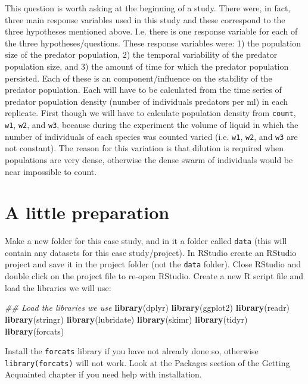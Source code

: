 \documentclass[]{book}
\makeatletter
\newenvironment{Shaded}{\begin{snugshade}}{\end{snugshade}}
\newcommand{\CommentTok}[1]{\textcolor[rgb]{0.56,0.35,0.01}{\textit{#1}}}
\newcommand{\KeywordTok}[1]{\textcolor[rgb]{0.13,0.29,0.53}{\textbf{#1}}}
\newcommand{\NormalTok}[1]{#1}
\newenvironment{kframe}{%
\medskip{}
\setlength{\fboxsep}{.8em}
 \def\at@end@of@kframe{}%
 \ifinner\ifhmode%
  \def\at@end@of@kframe{\end{minipage}}%
  \begin{minipage}{\columnwidth}%
 \fi\fi%
 \def\FrameCommand##1{\hskip\@totalleftmargin \hskip-\fboxsep
 \colorbox{shadecolor}{##1}\hskip-\fboxsep
     \hskip-\linewidth \hskip-\@totalleftmargin \hskip\columnwidth}%
 \MakeFramed {\advance\hsize-\width
   \@totalleftmargin\z@ \linewidth\hsize
   \@setminipage}}%
 {\par\unskip\endMakeFramed%
 \at@end@of@kframe}
\newenvironment{rmdblock}[1]
  {
  \begin{itemize}
  \renewcommand{\labelitemi}{
    \raisebox{-.7\height}[0pt][0pt]{
      {\setkeys{Gin}{width=3em,keepaspectratio}\texttt{[image: images/\#1]}}
    }
  }
  \setlength{\fboxsep}{1em}
  \begin{kframe}
  \item
  }
  {
  \end{kframe}
  \end{itemize}
  }
\newenvironment{action}
  {\begin{rmdblock}{action}}
  {\end{rmdblock}}
\makeatother
\begin{document}
This question is worth asking at the beginning of a study. There were, in fact, three main response variables used in this study and these correspond to the three hypotheses mentioned above. I.e. there is one response variable for each of the three hypotheses/questions. These response variables were: 1) the population size of the predator population, 2) the temporal variability of the predator population size, and 3) the amount of time for which the predator population persisted. Each of these is an component/influence on the stability of the predator population. Each will have to be calculated from the time series of predator population density (number of individuals predators per ml) in each replicate. First though we will have to calculate population density from \texttt{count}, \texttt{w1}, \texttt{w2}, and \texttt{w3}, because during the experiment the volume of liquid in which the number of individuals of each species was counted varied (i.e. \texttt{w1}, \texttt{w2}, and \texttt{w3} are not constant). The reason for this variation is that dilution is required when populations are very dense, otherwise the dense swarm of individuals would be near impossible to count.

\hypertarget{a-little-preparation-1}{%
\section{A little preparation}\label{a-little-preparation-1}}

Make a new folder for this case study, and in it a folder called \texttt{data} (this will contain any datasets for this case study/project). In RStudio create an RStudio project and save it in the project folder (not the \texttt{data} folder). Close RStudio and double click on the project file to re-open RStudio. Create a new R script file and load the libraries we will use:

\begin{Shaded}
\begin{Highlighting}[]
\CommentTok{## Load the libraries we use}
\KeywordTok{library}\NormalTok{(dplyr)}
\KeywordTok{library}\NormalTok{(ggplot2)}
\KeywordTok{library}\NormalTok{(readr)}
\KeywordTok{library}\NormalTok{(stringr)}
\KeywordTok{library}\NormalTok{(lubridate)}
\KeywordTok{library}\NormalTok{(skimr)}
\KeywordTok{library}\NormalTok{(tidyr)}
\KeywordTok{library}\NormalTok{(forcats)}
\end{Highlighting}
\end{Shaded}

\begin{action}
Install the \texttt{forcats} library if you have not already done so,
otherwise \texttt{library(forcats)} will not work. Look at the Packages
section of the Getting Acquainted chapter if you need help with
installation.
\end{action}
\end{document}
